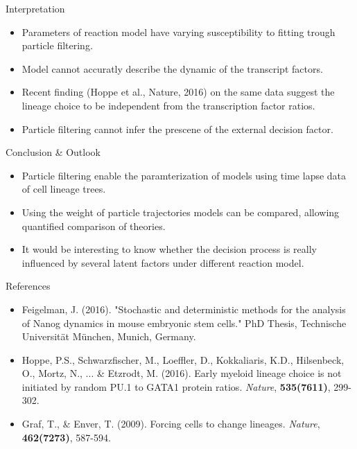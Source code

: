 \documentclass[pdf]
{beamer}
\begin{document}
\begin{frame}{Interpretation}
	\begin{itemize}
		\item Parameters of reaction model have varying susceptibility to fitting trough particle filtering.
		\item Model cannot accuratly describe the dynamic of the transcript factors.
		\item Recent finding (Hoppe et al., Nature, 2016) on the same data suggest the lineage choice to be independent from the transcription factor ratios.
		\item Particle filtering cannot infer the prescene of the external decision factor.
	\end{itemize}
\end{frame}

\begin{frame}{Conclusion \& Outlook}
	\begin{itemize}
		\item Particle filtering enable  the paramterization of models using time lapse data of cell lineage trees.
		\item Using the weight of particle trajectories models can be compared, allowing quantified comparison of theories.
		\item It would be interesting to know whether the decision process is really influenced by several latent factors under different reaction model.
	\end{itemize}
\end{frame}

\begin{frame}{References}

	\begin{itemize}
		\item Feigelman, J. (2016). "Stochastic and deterministic methods for the analysis of Nanog dynamics in mouse embryonic stem cells." PhD Thesis, Technische Universit\"at M\"unchen, Munich, Germany.
		\item Hoppe, P.S., Schwarzfischer, M., Loeffler, D.,  Kokkaliaris, K.D., Hilsenbeck, O., Mortz, N., ... \& Etzrodt, M. (2016). Early myeloid lineage choice is not initiated by random PU.1 to GATA1 protein ratios. \textit{Nature}, \textbf{535(7611)}, 299-302.
		\item Graf, T., \& Enver, T. (2009). Forcing cells to change lineages. \textit{Nature}, \textbf{462(7273)}, 587-594.
	\end{itemize}
\end{frame}
\end{document}
